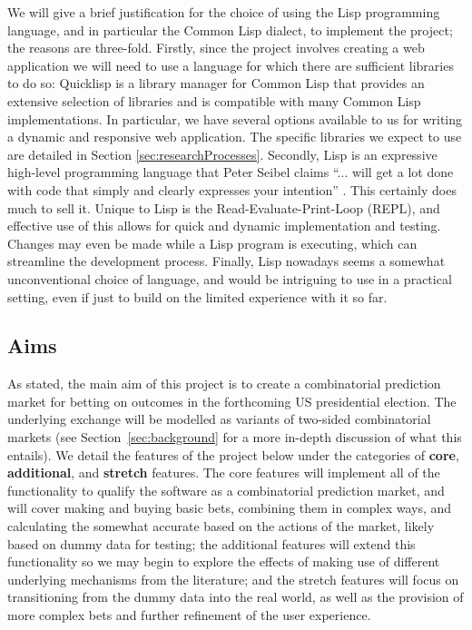 \documentclass[10pt,a4paper]{article}
\theoremstyle{plain}
\theoremstyle{definition}
\begin{document}
	We will give a brief justification for the choice of using the Lisp
	programming language, and in particular the Common Lisp dialect, to
	implement the project; the reasons are three-fold. Firstly, since the
	project involves creating a web application we will need to use a language
	for which there are sufficient libraries to do so: Quicklisp
	\cite{Quicklisp} is a library manager for Common Lisp that provides an
	extensive selection of libraries and is compatible with many Common Lisp
	implementations. In particular, we have several options available to us for
	writing a dynamic and responsive web application. The specific libraries we
	expect to use are detailed in Section \ref{sec:researchProcesses}.
	Secondly, Lisp is an expressive high-level programming language that Peter
	Seibel claims ``... will get a lot done with code that simply and clearly
	expresses your intention'' \cite{PracticalCommonLisp}. This certainly does
	much to sell it. Unique to Lisp is the Read-Evaluate-Print-Loop (REPL), and
	effective use of this allows for quick and dynamic implementation and
	testing. Changes may even be made while a Lisp program is executing, which
	can streamline the development process. Finally, Lisp nowadays seems a
	somewhat unconventional choice of language, and would be intriguing to use
	in a practical setting, even if just to build on the limited experience
	with it so far.

	\subsection{Aims}

	As stated, the main aim of this project is to create a combinatorial
	prediction market for betting on outcomes in the forthcoming US
	presidential election. The underlying exchange will be modelled as variants
	of two-sided combinatorial markets (see Section~\ref{sec:background} for a
	more in-depth discussion of what this entails). We detail the features of
	the project below under the categories of \textbf{core},
	\textbf{additional}, and \textbf{stretch} features. The core features will
	implement all of the functionality to qualify the software as a
	combinatorial prediction market, and will cover making and buying basic
	bets, combining them in complex ways, and calculating the somewhat accurate
	based on the actions of the market, likely based on dummy data for testing;
	the additional features will extend this functionality so we may begin to
	explore the effects of making use of different underlying mechanisms from
	the literature; and the stretch features will focus on transitioning from
	the dummy data into the real world, as well as the provision of more
	complex bets and further refinement of the user experience.
\end{document}

